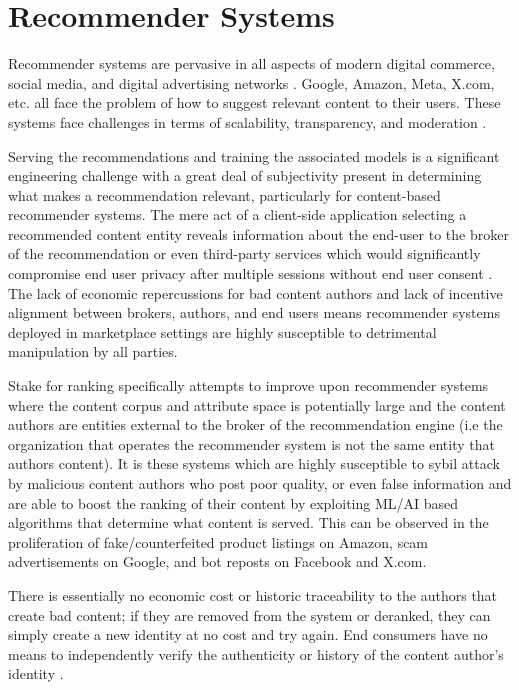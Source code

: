 \section{Recommender Systems}


Recommender systems are pervasive in all aspects of modern digital commerce, social media, and digital advertising networks \cite{resnick1997recommender} \cite{lops2011content} \cite{gomez2015netflix}. Google, Amazon, Meta, X.com, etc. all face the problem of how to suggest relevant content to their users. These systems face challenges in terms of scalability, transparency, and moderation \cite{wang2022trustworthy}. 

Serving the recommendations and training the associated models is a significant engineering challenge with a great deal of subjectivity present in determining what makes a recommendation relevant, particularly for content-based recommender systems. The mere act of a client-side application selecting a recommended content entity reveals information about the end-user to the broker of the recommendation or even third-party services which would significantly compromise end user privacy after multiple sessions without end user consent \cite{boutet2018collaborative}. The lack of economic repercussions for bad content authors and lack of incentive alignment between brokers, authors, and end users means recommender systems deployed in marketplace settings are highly susceptible to detrimental manipulation by all parties.

Stake for ranking specifically attempts to improve upon recommender systems where the content corpus and attribute space is potentially large and the content authors are entities external to the broker of the recommendation engine (i.e the organization that operates the recommender system is not the same entity that authors content). It is these systems which are highly susceptible to sybil attack by malicious content authors who post poor quality, or even false information and are able to boost the ranking of their content by exploiting ML/AI based algorithms that determine what content is served. This can be observed in the proliferation of fake/counterfeited product listings on Amazon, scam advertisements on Google, and bot reposts on Facebook and X.com. 

There is essentially no economic cost or historic traceability to the authors that create bad content; if they are removed from the system or deranked, they can simply create a new identity at no cost and try again. End consumers have no means to independently verify the authenticity or history of the content author's identity \cite{lin2022shilling}. 

